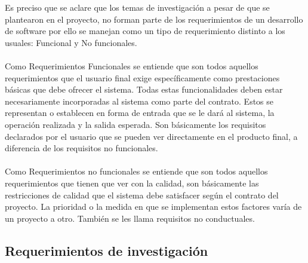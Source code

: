 \noindent Es preciso que se aclare que los temas de investigaci\'on a pesar de que se plantearon en el proyecto, no forman parte de los requerimientos de un desarrollo de software por ello se manejan como un tipo de requerimiento distinto a los usuales: Funcional y No funcionales.
\\
\\
\noindent Como Requerimientos Funcionales se entiende  que son todos aquellos requerimientos que el usuario final exige espec\'ificamente como prestaciones b\'asicas que debe ofrecer el sistema. Todas estas funcionalidades deben estar necesariamente incorporadas al sistema como parte del contrato. Estos se representan o establecen en forma de entrada que se le dar\'a al sistema, la operaci\'on realizada y la salida esperada. Son b\'asicamente los requisitos declarados por el usuario que se pueden ver directamente en el producto final, a diferencia de los requisitos no funcionales\cite{geeksforgeeks_2020}.
\\
\\
\noindent Como Requerimientos no funcionales se entiende que son todos aquellos requerimientos que tienen que ver con la calidad, son b\'asicamente las restricciones de calidad que el sistema debe satisfacer seg\'un el contrato del proyecto. La prioridad o la medida en que se implementan estos factores var\'ia de un proyecto a otro. Tambi\'en se les llama requisitos no conductuales\cite{geeksforgeeks_2020}.

\subsection{Requerimientos de investigaci\'on}

